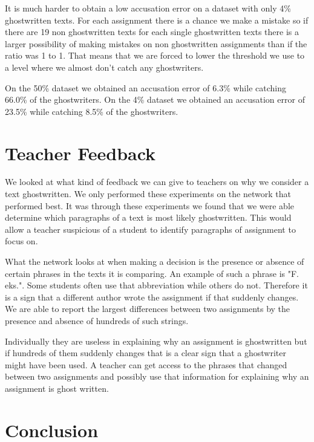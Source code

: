 \documentclass[11pt]{article}
\begin{document}
    It is much harder to obtain a low accusation error on a dataset with
    only 4\% ghostwritten texts. For each assignment there is a chance we
    make a mistake so if there are 19 non ghostwritten texts for each single
    ghostwritten texts there is a larger possibility of making mistakes on non
    ghostwritten assignments than if the ratio was 1 to 1. That means that we
    are forced to lower the threshold we use to a level where we almost don't
    catch any ghostwriters.

    On the 50\% dataset we obtained an accusation error of 6.3\% while catching
    66.0\% of the ghostwriters. On the 4\% dataset we obtained an accusation
    error of 23.5\% while catching 8.5\% of the ghostwriters.


    \section{Teacher Feedback}

    We looked at what kind of feedback we can give to teachers on why we
    consider a text ghostwritten. We only performed these experiments on the
    network that performed best. It was through these experiments we found
    that we were able determine which paragraphs of a text is most likely
    ghostwritten. This would allow a teacher suspicious of a student to identify
    paragraphs of assignment to focus on.

    What the network looks at when making a decision is the presence or absence
    of certain phrases in the texts it is comparing. An example of such a phrase
    is "F. eks.". Some students often use that abbreviation while others do not.
    Therefore it is a sign that a different author wrote the assignment if that
    suddenly changes. We are able to report the largest differences between two
    assignments by the presence and absence of hundreds of such strings.

    Individually they are useless in explaining why an assignment is
    ghostwritten but if hundreds of them suddenly changes that is a clear
    sign that a ghostwriter might have been used. A teacher can get access to
    the phrases that changed between two assignments and possibly use that
    information for explaining why an assignment is ghost written.


    \section{Conclusion}
\end{document}
